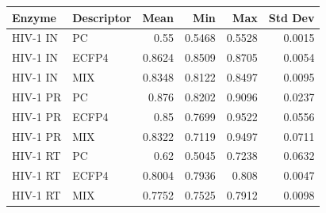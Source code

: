 \begin{tabular}{llrrrr}
\toprule
Enzyme & Descriptor & Mean & Min & Max & Std Dev \\
\midrule
HIV-1 IN & PC & 0.55 & 0.5468 & 0.5528 & 0.0015 \\
HIV-1 IN & ECFP4 & 0.8624 & 0.8509 & 0.8705 & 0.0054 \\
HIV-1 IN & MIX & 0.8348 & 0.8122 & 0.8497 & 0.0095 \\
HIV-1 PR & PC & 0.876 & 0.8202 & 0.9096 & 0.0237 \\
HIV-1 PR & ECFP4 & 0.85 & 0.7699 & 0.9522 & 0.0556 \\
HIV-1 PR & MIX & 0.8322 & 0.7119 & 0.9497 & 0.0711 \\
HIV-1 RT & PC & 0.62 & 0.5045 & 0.7238 & 0.0632 \\
HIV-1 RT & ECFP4 & 0.8004 & 0.7936 & 0.808 & 0.0047 \\
HIV-1 RT & MIX & 0.7752 & 0.7525 & 0.7912 & 0.0098 \\
\bottomrule
\end{tabular}
